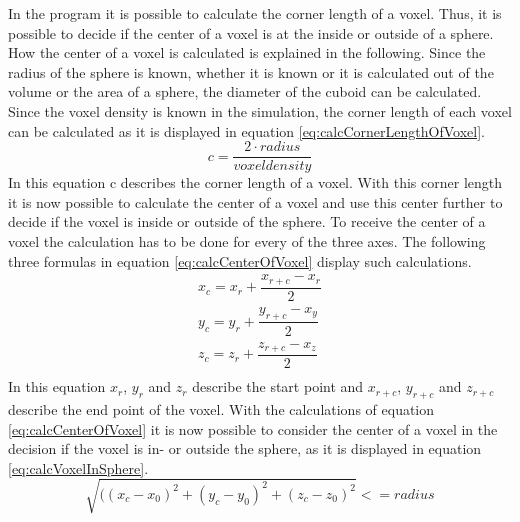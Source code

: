 In the program it is possible to calculate the corner length of a voxel. Thus, it is possible to decide if the center of a voxel is at the inside or outside of a sphere. How the center of a voxel is calculated is explained in the following. \newline
Since the radius of the sphere is known, whether it is known or it is calculated out of the volume or the area of a sphere, the diameter of the cuboid can be calculated. Since the voxel density is known in the simulation, the corner length of each voxel can be calculated as it is displayed in equation \ref{eq:calcCornerLengthOfVoxel}.
\begin{equation}\label{eq:calcCornerLengthOfVoxel}
c = \dfrac{2 \cdot radius}{voxel density}
\end{equation}
In this equation c describes the corner length of a voxel. With this corner length it is now possible to calculate the center of a voxel and use this center further to decide if the voxel is inside or outside of the sphere. To receive the center of a voxel the calculation has to be done for every of the three axes. The following three formulas in equation \ref{eq:calcCenterOfVoxel} display such calculations. 
\begin{equation}\label{eq:calcCenterOfVoxel}
\begin{split}
x_{c} = x_{r} + \dfrac{x_{r+c} - x_{r}}{2} \\
y_{c} = y_{r} + \dfrac{y_{r+c} - x_{y}}{2} \\
z_{c} = z_{r} + \dfrac{z_{r+c} - x_{z}}{2} \\
\end{split}
\end{equation}
In this equation $x_{r}$, $y_{r}$ and $z_{r}$ describe the start point and $x_{r+c}$, $y_{r+c}$ and $z_{r+c}$ describe the end point of the voxel.
With the calculations of equation \ref{eq:calcCenterOfVoxel} it is now possible to consider the center of a voxel in the decision if the voxel is in- or outside the sphere, as it is displayed in equation \ref{eq:calcVoxelInSphere}.
\begin{equation}\label{eq:calcVoxelInSphere}
\sqrt{((x_{c} - x_{0})^{2} + (y_{c} - y_{0})^{2} + (z_{c} -z_{0})^{2}} <= radius
\end{equation}



